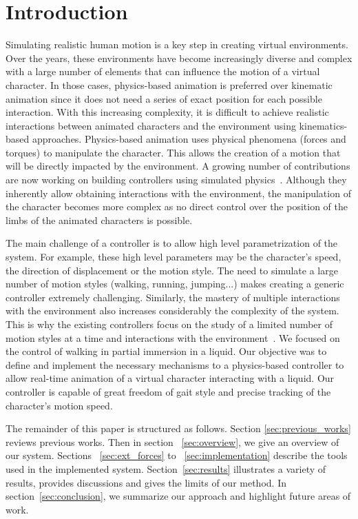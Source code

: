 \documentclass[runningheads,a4paper,10pt]{llncs}
\begin{document}
\section{Introduction}

Simulating realistic human motion is a key step in creating virtual environments. Over the years, these environments have become increasingly diverse and complex with a large number of elements that can influence the motion of a virtual character. In those cases, physics-based animation is preferred over kinematic animation since it does not need a series of exact position for each possible interaction. With this increasing complexity, it is difficult to achieve realistic interactions between animated characters and the environment using kinematics-based approaches. Physics-based animation uses physical phenomena (forces and torques) to manipulate the character. This allows the creation of a motion that will be directly impacted by the environment. A growing number of contributions are now working on building controllers using simulated physics~\citep{geijtenbeek2012interactive}. Although they inherently allow obtaining interactions with the environment, the manipulation of the character becomes more complex as no direct control over the position of the limbs of the animated characters is possible.

The main challenge of a controller is to allow high level parametrization of the system. For example, these high level parameters may be the character's speed, the direction of displacement or the motion style. The need to simulate a large number of motion styles (walking, running, jumping...) makes creating a generic controller extremely challenging. Similarly, the mastery of multiple interactions with the environment also increases considerably the complexity of the system. This is why the existing controllers focus on the study of a limited number of motion styles at a time and interactions with the environment~\citep{geijtenbeek2012interactive}. We focused on the control of walking in partial immersion in a liquid. Our objective was to define and implement the necessary mechanisms to a physics-based controller to allow real-time animation of a virtual character interacting with a liquid. Our controller is capable of great freedom of gait style and precise tracking of the character's motion speed.


The remainder of this paper is structured as follows. Section \ref{sec:previous_works} reviews previous works. Then in section ~\ref{sec:overview}, we give an overview of our system. Sections ~\ref{sec:ext_forces} to ~\ref{sec:implementation} describe the tools used in the implemented system. Section~\ref{sec:results} illustrates a variety of results, provides discussions and gives the limits of our method. In section~\ref{sec:conclusion}, we summarize our approach and highlight future areas of work.
 
\end{document}

